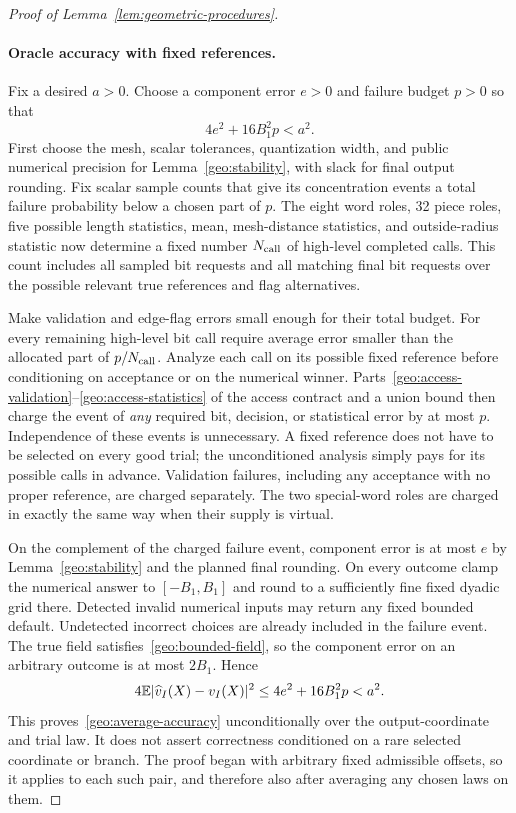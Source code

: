\begin{proof}[Proof of Lemma~\ref{lem:geometric-procedures}]
\paragraph{Oracle accuracy with fixed references.}
Fix a desired $a>0$. Choose a component error $e>0$ and failure budget
$p>0$ so that
\begin{equation}\label{geo:accuracy-budget}
 4e^2+16B_1^2p<a^2.
\end{equation}
First choose the mesh, scalar tolerances, quantization width, and public
numerical precision for Lemma~\ref{geo:stability}, with slack for final
output rounding. Fix scalar sample counts that give its concentration
events a total failure probability below a chosen part of $p$.
The eight word roles, 32 piece roles, five possible length statistics,
mean, mesh-distance statistics, and outside-radius statistic now
determine a fixed number $N_{\rm call}$ of high-level completed calls. This count
includes all sampled bit requests and all matching final bit requests
over the possible relevant true references and flag alternatives.

Make validation and edge-flag errors small enough for their total budget.
For every remaining high-level bit call require average error smaller
than the allocated part of $p/N_{\rm call}$. Analyze each call on its possible
fixed reference before conditioning on acceptance or on the numerical
winner. Parts~\ref{geo:access-validation}--\ref{geo:access-statistics}
of the access contract and a union bound then charge the event of
\emph{any} required bit, decision, or statistical error by at most
$p$. Independence of these events is unnecessary. A fixed reference
does not have to be selected on every good trial; the unconditioned
analysis simply pays for its possible calls in advance. Validation
failures, including any acceptance with no proper reference, are
charged separately. The two special-word roles are charged in exactly
the same way when their supply is virtual.

On the complement of the charged failure event, component error is
at most $e$ by Lemma~\ref{geo:stability} and the planned final rounding.
On every outcome clamp the numerical answer to $[-B_1,B_1]$ and round
to a sufficiently fine fixed dyadic grid there. Detected invalid
numerical inputs may return any fixed bounded default. Undetected
incorrect choices are already included in the failure event. The true
field satisfies~\eqref{geo:bounded-field}, so the component error on
an arbitrary outcome is at most $2B_1$. Hence
\[
 4\mathbb{E}|\widehat v_I(X)-v_I(X)|^2
    \le4e^2+16B_1^2p<a^2.
\]
This proves~\eqref{geo:average-accuracy} unconditionally over the
output-coordinate and trial law. It does not assert correctness
conditioned on a rare selected coordinate or branch. The proof began
with arbitrary fixed admissible offsets, so it applies to each such
pair, and therefore also after averaging any chosen laws on them.


\end{proof}
